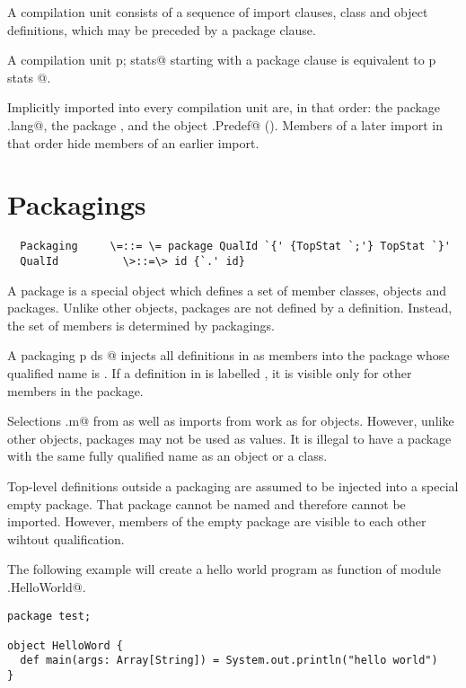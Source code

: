 \documentclass[11pt]{report}
\begin{document}
A compilation unit consists of a sequence of import clauses, class and
object definitions, which may be preceded by a package clause.

A compilation unit \verb@package p; stats@ starting with a package
clause is equivalent to \verb@package p { stats }@.

Implicitly imported into every compilation unit are, in that order:
the package \verb@java.lang@, the package \verb@scala@, and the object
\verb@scala.Predef@ (). Members of a later import in
that order hide members of an earlier import.

\section{Packagings}

\syntax\begin{verbatim}
  Packaging     \=::= \= package QualId `{' {TopStat `;'} TopStat `}'
  QualId          \>::=\> id {`.' id}
\end{verbatim}

A package is a special object which defines a set of member classes,
objects and packages.  Unlike other objects, packages are not defined
by a definition.  Instead, the set of members is determined by
packagings.

A packaging \verb@package p { ds }@ injects all definitions in
\verb@ds@ as members into the package whose qualified name is
\verb@p@. If a definition in \verb@ds@ is labelled \verb@private@, it
is visible only for other members in the package.

Selections \verb@p.m@ from \verb@p@ as well as imports from \verb@p@
work as for objects. However, unlike other objects, packages may not
be used as values. It is illegal to have a package with the same fully
qualified name as an object or a class.

Top-level definitions outside a packaging are assumed to be injected
into a special empty package. That package cannot be named and
therefore cannot be imported. However, members of the empty package
are visible to each other wihtout qualification.

\example The following example will create a hello world program as
function \verb@main@ of module \verb@test.HelloWorld@.
\begin{verbatim}
package test;

object HelloWord {
  def main(args: Array[String]) = System.out.println("hello world")
}
\end{verbatim}
\end{document}

